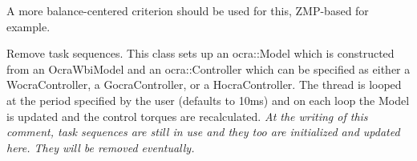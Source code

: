 
\begin{DoxyRefList}
\item[\label{todo__todo000002}%
\hypertarget{todo__todo000002}{}%
Member \hyperlink{classSteppingDemoClient_ad8fbc186267a47a73bb77e78199f2b8c}{Stepping\+Demo\+Client\+:\+:is\+Balanced} ()]A more balance-\/centered criterion should be used for this, Z\+M\+P-\/based for example.  
\item[\label{todo__todo000001}%
\hypertarget{todo__todo000001}{}%
Class \hyperlink{classThread}{Thread} ]Remove task sequences. This class sets up an ocra\+::\+Model which is constructed from an Ocra\+Wbi\+Model and an ocra\+::\+Controller which can be specified as either a Wocra\+Controller, a Gocra\+Controller, or a Hocra\+Controller. The thread is looped at the period specified by the user (defaults to 10ms) and on each loop the Model is updated and the control torques are recalculated. {\itshape At the writing of this comment, task sequences are still in use and they too are initialized and updated here. They will be removed eventually.} 
\end{DoxyRefList}